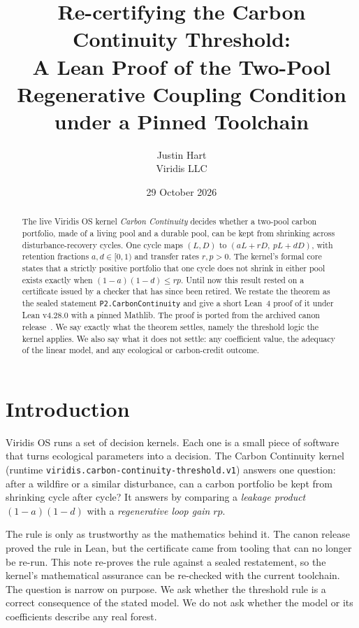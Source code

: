 \documentclass[11pt]{article}
\title{Re-certifying the Carbon Continuity Threshold:\\ A Lean Proof of the Two-Pool Regenerative Coupling Condition\\ under a Pinned Toolchain}
\author{Justin Hart\\ Viridis LLC}
\date{29 October 2026}
\theoremstyle{remark}
\begin{document}
\maketitle

\begin{abstract}
The live Viridis OS kernel \emph{Carbon Continuity} decides whether a two-pool carbon portfolio,
made of a living pool and a durable pool, can be kept from shrinking across disturbance-recovery cycles.
One cycle maps $(L,D)$ to $(aL+rD,\ pL+dD)$, with retention fractions $a,d\in[0,1)$ and transfer rates $r,p>0$.
The kernel's formal core states that a strictly positive portfolio that one cycle does not shrink in either pool
exists exactly when $(1-a)(1-d)\le rp$.
Until now this result rested on a certificate issued by a checker that has since been retired.
We restate the theorem as the sealed statement \texttt{P2.CarbonContinuity}
and give a short Lean~4 proof of it under Lean v4.28.0 with a pinned Mathlib.
The proof is ported from the archived canon release~\cite{HartCanon2026}.
We say exactly what the theorem settles, namely the threshold logic the kernel applies.
We also say what it does not settle: any coefficient value, the adequacy of the linear model,
and any ecological or carbon-credit outcome.
\end{abstract}

\section{Introduction}
Viridis OS runs a set of decision kernels. Each one is a small piece of software that turns ecological
parameters into a decision. The Carbon Continuity kernel
(runtime \texttt{viridis.carbon-continuity-threshold.v1}) answers one question: after a wildfire or a similar
disturbance, can a carbon portfolio be kept from shrinking cycle after cycle?
It answers by comparing a \emph{leakage product} $(1-a)(1-d)$ with a \emph{regenerative loop gain} $rp$.

The rule is only as trustworthy as the mathematics behind it. The canon release~\cite{HartCanon2026}
proved the rule in Lean, but the certificate came from tooling that can no longer be re-run.
This note re-proves the rule against a sealed restatement, so the kernel's mathematical assurance
can be re-checked with the current toolchain.
The question is narrow on purpose. We ask whether the threshold rule is a correct consequence of the stated model.
We do not ask whether the model or its coefficients describe any real forest.
\end{document}
